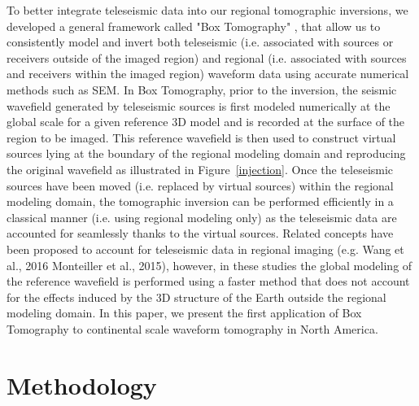 \documentclass[12pt]{article}
\begin{document}
 To better integrate teleseismic data into our regional tomographic inversions, we developed a general framework called "Box Tomography"  \citep[see][]{masson2013numerical,masson2016box,masson2017fast}, that allow us to consistently model and invert both teleseismic (i.e. associated with sources or receivers outside of the imaged region) and regional (i.e. associated with sources and receivers within the imaged region) waveform data using accurate numerical methods such as SEM. 
 In Box Tomography, prior to the inversion, the seismic wavefield generated by teleseismic sources is first modeled numerically at the global scale for a given reference 3D model and is recorded at the surface of the region to be imaged. 
 This reference wavefield is then used to construct virtual sources lying at the boundary of the regional modeling domain and reproducing the original wavefield as illustrated in Figure~\ref{injection}. 
 Once the teleseismic sources have been moved (i.e. replaced by virtual sources) within the regional modeling domain, the tomographic inversion can be performed efficiently in a classical manner (i.e. using regional modeling only) as the teleseismic data are accounted for seamlessly thanks to the virtual sources. 
 Related concepts have been proposed to account for teleseismic data in regional imaging (e.g. Wang et al., 2016 Monteiller et al., 2015), however, in these studies the global modeling of the reference wavefield is performed using a faster method that does not account for the effects induced by the 3D structure of the Earth outside the regional modeling domain. In this paper, we present the first application of Box Tomography to continental scale waveform tomography in North America.


\section{Methodology}
\end{document}
